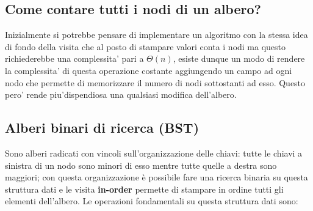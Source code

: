 \documentclass{article}
\begin{document}
\subsection{Come contare tutti i nodi di un albero?}
Inizialmente si potrebbe pensare di implementare un algoritmo con la stessa idea di fondo della visita che al posto di stampare valori conta i nodi ma questo richiederebbe una complessita' pari a $\Theta(n)$, esiste dunque un modo di rendere la complessita' di questa operazione costante aggiungendo un campo ad ogni nodo che permette di memorizzare il numero di nodi sottostanti ad esso. Questo pero' rende piu'dispendiosa una qualsiasi modifica dell'albero.


\subsection{Alberi binari di ricerca (BST)}
Sono alberi radicati con vincoli sull'organizzazione delle chiavi: tutte le chiavi a sinistra di un nodo sono minori di esso mentre tutte quelle a destra sono maggiori;
con questa organizzazione è possibile fare una ricerca binaria su questa struttura dati e le visita \textbf{in-order} permette di stampare in ordine tutti gli elementi dell'albero. 
Le operazioni fondamentali su questa struttura dati sono:
\end{document}
